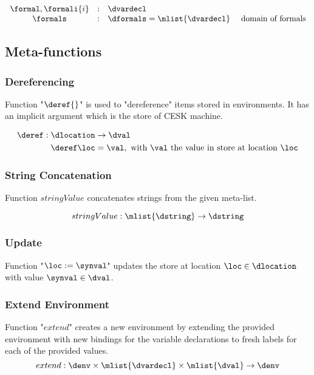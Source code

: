 \documentclass{article}
\begin{document}
\[
  \begin{array}{ccll}
	\formal, \formali{i} & : & \dvardecl\\
	\formals & : & \dformals = \mlist{\dvardecl} &\textrm{ domain of formals}\\

  \end{array}
\]
\subsection{Meta-functions}
\label{subsec:meta-functions}
\subsubsection{Dereferencing}
\label{subsubsection:dereferecing}
Function "$\deref{}$" is used to "dereference" items stored in environments. It has an implicit argument which is the store of CESK machine.

\begin{align*}
  \deref : \dlocation &\rightarrow \dval \\
  \deref\loc &=  \val, \textrm{ with $\val$ the value in store at location } \loc
\end{align*}

\subsubsection{String Concatenation}
\label{subsubsec:string-concatenation}
Function $stringValue$ concatenates strings from the given meta-list.

\[stringValue : \mlist{\dstring} \rightarrow \dstring\]

\subsubsection{Update}
\label{subsubsec:store-update}
\newcommand{\update}[2]{{#1} := {#2}}
Function "$\update{\loc}{\synval}$" updates the store at location $\loc \in \dlocation$ with value $\synval \in \dval$.

\subsubsection{Extend Environment}
\label{subsubsec:extend-env}

Function "$extend$" creates a new environment by extending the provided environment with new bindings for the variable declarations to fresh labels for each of the provided values.
\[extend : \denv \times \mlist{\dvardecl} \times \mlist{\dval} \rightarrow  \denv \]
\end{document}
